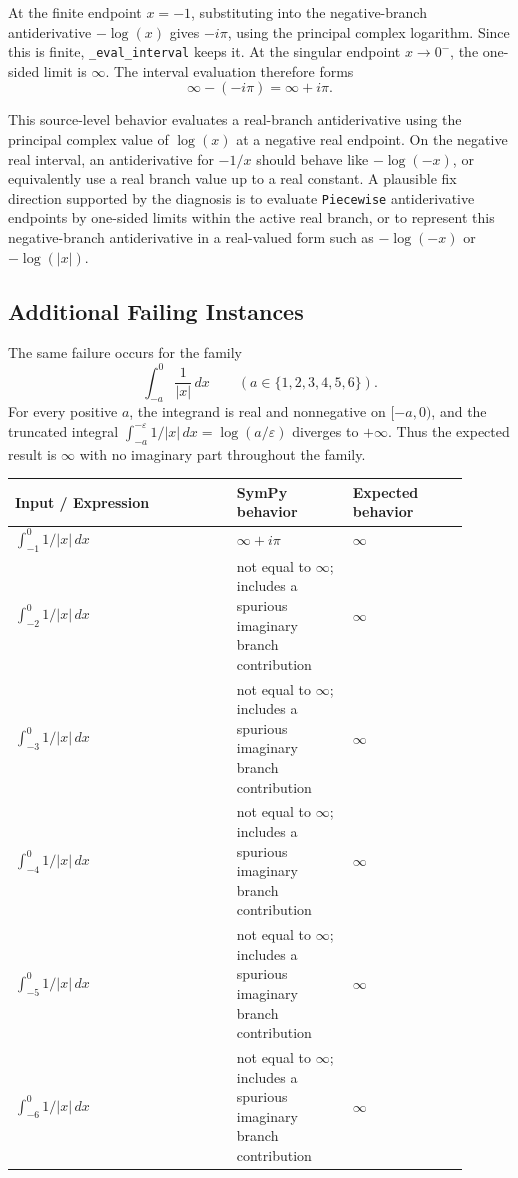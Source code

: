 \documentclass[11pt]{article}
\begin{document}
At the finite endpoint \(x=-1\), substituting into the negative-branch
antiderivative \(-\log(x)\) gives \(-i\pi\), using the principal complex
logarithm.  Since this is finite, \texttt{\_eval\_interval} keeps it.  At the
singular endpoint \(x \to 0^-\), the one-sided limit is \(\infty\).  The
interval evaluation therefore forms
\[
  \infty - (-i\pi) = \infty + i\pi.
\]

This source-level behavior evaluates a real-branch antiderivative using the
principal complex value of \(\log(x)\) at a negative real endpoint.  On the
negative real interval, an antiderivative for \(-1/x\) should behave like
\(-\log(-x)\), or equivalently use a real branch value up to a real constant.
A plausible fix direction supported by the diagnosis is to evaluate
\texttt{Piecewise} antiderivative endpoints by one-sided limits within the
active real branch, or to represent this negative-branch antiderivative in a
real-valued form such as \(-\log(-x)\) or \(-\log(|x|)\).

\subsection{Additional Failing Instances}

The same failure occurs for the family
\[
  \int_{-a}^{0} \frac{1}{|x|}\,dx
  \qquad (a \in \{1,2,3,4,5,6\}).
\]
For every positive \(a\), the integrand is real and nonnegative on
\([-a,0)\), and the truncated integral
\(\int_{-a}^{-\varepsilon} 1/|x|\,dx=\log(a/\varepsilon)\) diverges to
\(+\infty\).  Thus the expected result is \(\infty\) with no imaginary part
throughout the family.

\begin{center}
\small
\renewcommand{\arraystretch}{1.3}
\begin{tabular}{@{}>{\raggedright\arraybackslash}p{0.44\linewidth}>{\raggedright\arraybackslash}p{0.23\linewidth}>{\raggedright\arraybackslash}p{0.23\linewidth}@{}}
\toprule
\textbf{Input / Expression} & \textbf{SymPy behavior} & \textbf{Expected behavior} \\
\midrule
\(\int_{-1}^{0} 1/|x|\,dx\) & \(\infty+i\pi\) & \(\infty\) \\
\(\int_{-2}^{0} 1/|x|\,dx\) & not equal to \(\infty\); includes a spurious imaginary branch contribution & \(\infty\) \\
\(\int_{-3}^{0} 1/|x|\,dx\) & not equal to \(\infty\); includes a spurious imaginary branch contribution & \(\infty\) \\
\(\int_{-4}^{0} 1/|x|\,dx\) & not equal to \(\infty\); includes a spurious imaginary branch contribution & \(\infty\) \\
\(\int_{-5}^{0} 1/|x|\,dx\) & not equal to \(\infty\); includes a spurious imaginary branch contribution & \(\infty\) \\
\(\int_{-6}^{0} 1/|x|\,dx\) & not equal to \(\infty\); includes a spurious imaginary branch contribution & \(\infty\) \\
\bottomrule
\end{tabular}
\end{center}
\end{document}
